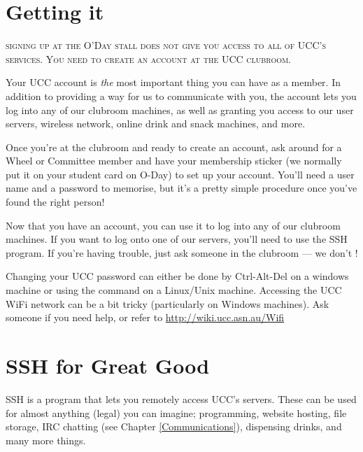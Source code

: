 \label{SetupAccount}



\section{Getting it}

\textsc{signing up at the O'Day stall does not give you access to all of UCC's services. You need to create an account at the UCC clubroom.}

Your UCC account is \emph{the} most important thing you can have as a member. In addition to providing a way for us to communicate with you, the account lets you log into any of our clubroom machines, as well as granting you access to our user servers, wireless network, online drink and snack machines, and more.

Once you're at the clubroom and ready to create an account, ask around for a Wheel or Committee member and have your membership sticker (we normally put it on your student card on O-Day) to set up your account. You'll need a user name and a password to memorise, but it's a pretty simple procedure once you've found the right person!


Now that you have an account, you can use it to log into any of our clubroom machines. If you want to log onto one of our servers, you'll need to use the SSH program. If you're having trouble, just ask someone in the clubroom --- we don't !

Changing your UCC password can either be done by Ctrl-Alt-Del on a windows machine or using the command  on a Linux/Unix machine.
Accessing the UCC WiFi network can be a bit tricky (particularly on Windows machines). Ask someone if you need help, or refer to \url{http://wiki.ucc.asn.au/Wifi}


\pagebreak


\section{SSH for Great Good}

SSH is a program that lets you remotely access UCC's servers. These can be used for almost anything (legal) you can imagine; programming, website hosting, file storage, IRC chatting (see Chapter \ref{Communications}), dispensing drinks, and many more things.

